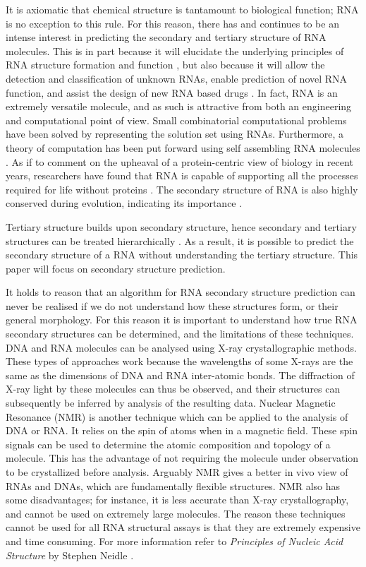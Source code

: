 \documentclass{cshonours}
\begin{document}
It is axiomatic that chemical structure is tantamount to biological function; RNA is no exception to this rule. For this reason, there has and continues to be an intense interest in predicting the secondary and tertiary structure of RNA molecules. This is in part because it will elucidate the underlying principles of RNA structure formation and function \cite{conn1998rna}, but also because it will allow the detection and classification of unknown RNAs, enable prediction of novel RNA function, and assist the design of new RNA based drugs \cite{condon2003problems}. In fact, RNA is an extremely versatile molecule, and as such is attractive from both an engineering and computational point of view. Small combinatorial computational problems have been solved by representing the solution set using RNAs. Furthermore, a theory of computation has been put forward using self assembling RNA molecules \cite{condon2003problems}. As if to comment on the upheaval of a protein-centric view of biology in recent years, researchers have found that RNA is capable of supporting all the processes required for life without proteins \cite{condon2003problems}. The secondary structure of RNA is also highly conserved during evolution, indicating its importance \cite{hofacker2008rna}. 


Tertiary structure builds upon secondary structure, hence secondary and tertiary structures can be treated hierarchically \cite{tinoco1999rna}. As a result, it is possible to predict the secondary structure of a RNA without understanding the tertiary structure. This paper will focus on secondary structure prediction.

It holds to reason that an algorithm for RNA secondary structure prediction can never be realised if we do not understand how these structures form, or their general morphology. For this reason it is important to understand how true RNA secondary structures can be determined, and the limitations of these techniques. DNA and RNA molecules can be analysed using X-ray crystallographic methods. These types of approaches work because the wavelengths of some X-rays are the same as the dimensions of DNA and RNA inter-atomic bonds. The diffraction of X-ray light by these molecules can thus be observed, and their structures can subsequently be inferred by analysis of the resulting data. Nuclear Magnetic Resonance (NMR) is another technique which can be applied to the analysis of DNA or RNA. It relies on the spin of atoms when in a magnetic field. These spin signals can be used to determine the atomic composition and topology of a molecule. This has the advantage of not requiring the molecule under observation to be crystallized before analysis. Arguably NMR gives a better in vivo view of RNAs and DNAs, which are fundamentally flexible structures. NMR also has some disadvantages; for instance, it is less accurate than X-ray crystallography, and cannot be used on extremely large molecules. The reason these techniques cannot be used for all RNA structural assays is that they are extremely expensive and time consuming. For more information refer to \emph{Principles of Nucleic Acid Structure} by Stephen Neidle \cite{neidle2010principles}.
\end{document}
